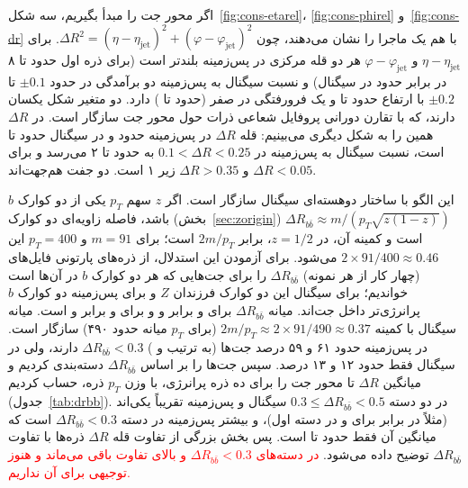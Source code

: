 اگر محور جت را مبدأ بگیریم، سه شکل~\ref{fig:cons-etarel}، \ref{fig:cons-phirel} و~\ref{fig:cons-dr} با هم یک ماجرا را نشان می‌دهند، چون $\Delta R^2=(\eta-\eta_\mathrm{jet})^2+(\varphi-\varphi_\mathrm{jet})^2$. برای $\eta-\eta_\mathrm{jet}$ و $\varphi-\varphi_\mathrm{jet}$ هر دو قله مرکزی در پس‌زمینه بلندتر است (برای ذره اول حدود  تا ۸ در برابر حدود  در سیگنال) و نسبت سیگنال به پس‌زمینه دو برآمدگی در حدود $\pm0.1$ تا $\pm0.2$ با ارتفاع حدود  تا  و یک فرورفتگی در صفر (حدود  تا ) دارد. دو متغیر شکل یکسان دارند، که با تقارن دورانی پروفایل شعاعی ذرات حول محور جت سازگار است. در $\Delta R$ همین را به شکل دیگری می‌بینیم: قله $\Delta R$ در پس‌زمینه حدود  و در سیگنال حدود  تا  است، نسبت سیگنال به پس‌زمینه در $0.1<\Delta R<0.25$ به حدود  تا ۲ می‌رسد و برای $\Delta R<0.05$ و $\Delta R>0.35$ زیر ۱ است. دو جفت هم‌جهت‌اند.

این الگو با ساختار دو‌هسته‌ای سیگنال سازگار است. اگر $z$ سهم $p_T$ یکی از دو کوارک $b$ باشد، فاصله زاویه‌ای دو کوارک (بخش~\ref{sec:zorigin}) $\Delta R_{b\bar b}\approx m/(p_T\sqrt{z(1-z)})$ است و کمینه آن، در $z=1/2$، برابر $2m/p_T$ است؛ برای $m=91$ و $p_T=400$ این $2\times91/400\approx0.46$ می‌شود. برای آزمودن این استدلال، از ذره‌های پارتونی فایل‌های  (چهار کار از هر نمونه) $\Delta R_{b\bar b}$ را برای جت‌هایی که هر دو کوارک $b$ در آن‌ها است خواندیم؛ برای سیگنال این دو کوارک فرزندان $Z$ و برای پس‌زمینه دو کوارک $b$ پرانرژی‌تر داخل جت‌اند. میانه $\Delta R_{b\bar b}$ برای \Zjet و \ttZ برابر  و  و برای \bbbb و \ttbb برابر  و  است. میانه سیگنال با کمینه $2m/p_T\approx2\times91/490\approx0.37$ (برای $p_T$ میانه حدود ۴۹۰) سازگار است. در پس‌زمینه حدود ۶۱ و ۵۹ درصد جت‌ها (به ترتیب \bbbb و \ttbb) $\Delta R_{b\bar b}<0.3$ دارند، ولی در سیگنال فقط حدود ۱۲ و ۱۳ درصد. سپس جت‌ها را بر اساس $\Delta R_{b\bar b}$ دسته‌بندی کردیم و میانگین $\Delta R$ تا محور جت را برای ده ذره پرانرژی، با وزن $p_T$ ذره، حساب کردیم (جدول~\ref{tab:drbb}). در دو دسته $0.3\le\Delta R_{b\bar b}<0.5$ سیگنال و پس‌زمینه تقریباً یکی‌اند (مثلاً  در برابر  برای \Zjet و \bbbb در دسته اول)، و بیشتر پس‌زمینه در دسته $\Delta R_{b\bar b}<0.3$ است که میانگین آن فقط حدود  تا  است. پس بخش بزرگی از تفاوت قله $\Delta R$ ذره‌ها با تفاوت $\Delta R_{b\bar b}$ توضیح داده می‌شود. \textcolor{red}{در دسته‌های $\Delta R_{b\bar b}<0.3$ و بالای  تفاوت باقی می‌ماند و هنوز توجیهی برای آن نداریم.}

